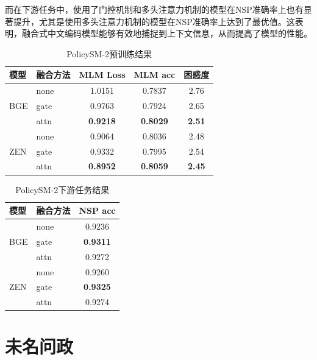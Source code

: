 \documentclass[12pt, a4paper]{ctexart}
\begin{document}
而在下游任务中，使用了门控机制和多头注意力机制的模型在NSP准确率上也有显著提升，尤其是使用多头注意力机制的模型在NSP准确率上达到了最优值。这表明，融合式中文编码模型能够有效地捕捉到上下文信息，从而提高了模型的性能。

\begin{table}[htbp]
    \centering
    \begin{tabular}{llccc}
      \toprule
      模型 & 融合方法 & MLM Loss & MLM acc & 困惑度 \\
      \midrule
      \multirow{3}{*}{BGE}
        & none & 1.0151 & 0.7837 & 2.76 \\
        & gate & 0.9763 & 0.7924 & 2.65 \\
        & attn & \textbf{0.9218} & \textbf{0.8029} & \textbf{2.51} \\
      \midrule
      \multirow{3}{*}{ZEN}
        & none & 0.9064 & 0.8036 & 2.48 \\
        & gate & 0.9332 & 0.7995 & 2.54 \\
        & attn & \textbf{0.8952} & \textbf{0.8059} & \textbf{2.45} \\
      \bottomrule
    \end{tabular}
    \caption{PolicySM-2预训练结果}
    \label{tab:pretrain-results}
  \end{table}
  
  \begin{table}[htbp]
    \centering
    \begin{tabular}{llc}
      \toprule
      模型 & 融合方法 & NSP acc \\
      \midrule
      \multirow{3}{*}{BGE}
        & none & 0.9236 \\
        & gate & \textbf{0.9311} \\
        & attn & 0.9272 \\
      \midrule
      \multirow{3}{*}{ZEN}
        & none & 0.9260 \\
        & gate & \textbf{0.9325} \\
        & attn & 0.9274 \\
      \bottomrule
    \end{tabular}
    \caption{PolicySM-2下游任务结果}
    \label{tab:nsp-results}
  \end{table}


\section{未名问政}
  
\end{document}
